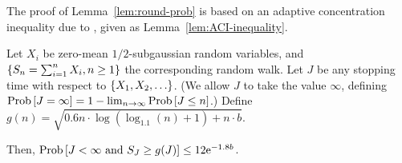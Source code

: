 The proof of Lemma~\ref{lem:round-prob} is based on an adaptive
concentration inequality due to \cite{zhao2016adaptive},
given as Lemma~\ref{lem:ACI-inequality}.

\begin{lemma}
\label{lem:ACI-inequality}
Let $X_i$ be zero-mean $1/2$-subgaussian random variables,
and $\{ S_n = \sum_{i=1}^n X_i, n \geq 1 \}$ the corresponding random walk.
Let $J$ be any stopping time with respect to $\{ X_1, X_2, \ldots \}$.
(We allow $J$ to take the value $\infty$,
defining $\Prob{J = \infty} = 1 - \lim_{n \to \infty} \Prob{J \leq n}$.)
Define 
$g(n)  = \sqrt{0.6 n \cdot \log (\log_{1.1}(n) + 1) + n \cdot b}$.

Then, 
$\Prob{J < \infty \mbox{ and } S_J \geq g(J)} \leq 12 \e^{-1.8 b}$.
\end{lemma}


